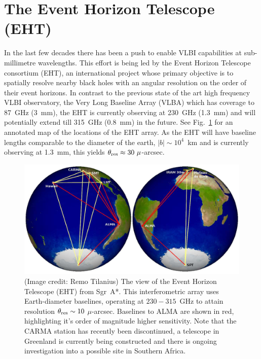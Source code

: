 \section{The Event Horizon Telescope (EHT)}

In the last few decades there has been a push to enable VLBI capabilities at sub-millimetre wavelengths. This effort is being led by the Event Horizon Telescope consortium (EHT), an international project whose primary objective is to spatially resolve nearby black holes with an angular resolution on the order of their event horizons. In contrast to the previous state of the art high frequency VLBI observatory, the Very Long Baseline Array (VLBA) which has coverage to 87~GHz (3~mm), the EHT is currently observing at 230~GHz (1.3~mm) and will potentially extend till 315~GHz (0.8~mm) in the future. See Fig.~\ref{fig:eht_globe} for an annotated map of the locations of the EHT array. As the EHT will have baseline lengths comparable to the diameter of the earth, $|b| \sim 10^4$~km and is currently observing at 1.3~mm, this yields $\theta_{\rm res} \approx 30\ \mu$-arcsec.

\begin{figure}
\begin{center}
\includegraphics[width=0.8\columnwidth]{Images/eht_globe}
\caption{(Image credit: Remo Tilanius) The view of the Event Horizon Telescope (EHT) from Sgr~A*. This interferometric array uses Earth-diameter baselines, operating at $230-315$~GHz to attain resolution $\theta_{\rm res} \sim 10$ $\mu$-arcsec. Baselines to ALMA are shown in red, highlighting it's order of magnitude higher sensitivity. Note that the CARMA station has recently been discontinued, a telescope in Greenland is currently being constructed and there is ongoing investigation into a possible site in Southern Africa.\label{fig:eht_globe}%
}
\end{center}
\end{figure}

